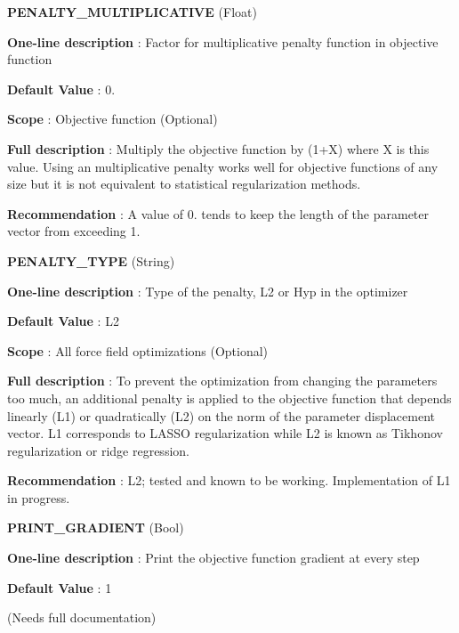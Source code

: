 \begin{DoxyItemize}
\item {\bfseries  P\-E\-N\-A\-L\-T\-Y\-\_\-\-M\-U\-L\-T\-I\-P\-L\-I\-C\-A\-T\-I\-V\-E } (Float) \par
{\bfseries  One-\/line description }\-: Factor for multiplicative penalty function in objective function \par
{\bfseries  Default Value }\-: 0. \par
{\bfseries  Scope }\-: Objective function (Optional) \par
{\bfseries  Full description }\-: Multiply the objective function by (1+\-X) where X is this value. Using an multiplicative penalty works well for objective functions of any size but it is not equivalent to statistical regularization methods. \par
{\bfseries  Recommendation }\-: A value of 0. tends to keep the length of the parameter vector from exceeding 1.\end{DoxyItemize}
\begin{DoxyItemize}
\item {\bfseries  P\-E\-N\-A\-L\-T\-Y\-\_\-\-T\-Y\-P\-E } (String) \par
{\bfseries  One-\/line description }\-: Type of the penalty, L2 or Hyp in the optimizer \par
{\bfseries  Default Value }\-: L2 \par
{\bfseries  Scope }\-: All force field optimizations (Optional) \par
{\bfseries  Full description }\-: To prevent the optimization from changing the parameters too much, an additional penalty is applied to the objective function that depends linearly (L1) or quadratically (L2) on the norm of the parameter displacement vector. L1 corresponds to L\-A\-S\-S\-O regularization while L2 is known as Tikhonov regularization or ridge regression. \par
{\bfseries  Recommendation }\-: L2; tested and known to be working. Implementation of L1 in progress.\end{DoxyItemize}
\begin{DoxyItemize}
\item {\bfseries  P\-R\-I\-N\-T\-\_\-\-G\-R\-A\-D\-I\-E\-N\-T } (Bool) \par
{\bfseries  One-\/line description }\-: Print the objective function gradient at every step \par
{\bfseries  Default Value }\-: 1 \par
(Needs full documentation)\end{DoxyItemize}
